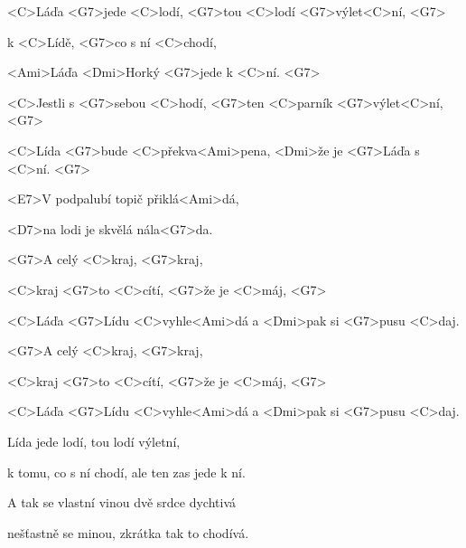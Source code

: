 
\zs
<C>Láďa <G7>jede <C>lodí, <G7>tou <C>lodí <G7>výlet<C>ní, <G7>

k <C>Lídě, <G7>co s ní <C>chodí,

<Ami>Láďa <Dmi>Horký <G7>jede k <C>ní. <G7>

<C>Jestli s <G7>sebou <C>hodí, <G7>ten <C>parník 
<G7>výlet<C>ní, <G7>

<C>Lída <G7>bude <C>překva<Ami>pena, <Dmi>že je 
<G7>Láďa s <C>ní. <G7>
\ks

\zr
<E7>V podpalubí topič přiklá<Ami>dá,

<D7>na lodi je skvělá nála<G7>da.

<G7>A celý <C>kraj, <G7>kraj,

<C>kraj <G7>to <C>cítí, <G7>že je <C>máj, <G7>

<C>Láďa <G7>Lídu <C>vyhle<Ami>dá a <Dmi>pak si 
<G7>pusu <C>daj.

<G7>A celý <C>kraj, <G7>kraj,

<C>kraj <G7>to <C>cítí, <G7>že je <C>máj, <G7>

<C>Láďa <G7>Lídu <C>vyhle<Ami>dá a <Dmi>pak si 
<G7>pusu <C>daj.
\kr

\zs
Lída jede lodí, tou lodí výletní,

k tomu, co s ní chodí, ale ten zas jede k ní.

A tak se vlastní vinou dvě srdce dychtivá

nešťastně se minou, zkrátka tak to chodívá.
\ks

\zr \kr

\kp


















